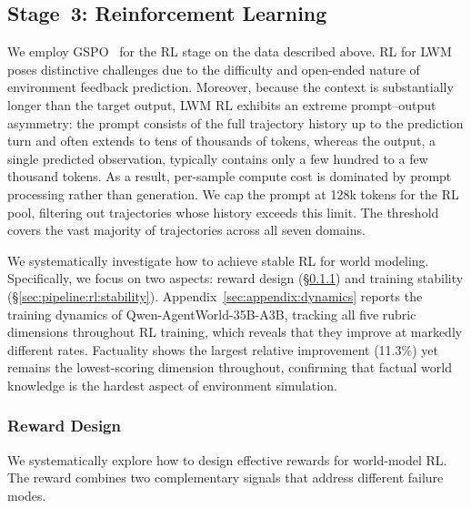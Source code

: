 \documentclass{llmxive}
\providecommand{\method}{Qwen-AgentWorld\xspace}
\begin{document}
\subsection{Stage~3: Reinforcement Learning}
\label{sec:pipeline:rl}

We employ GSPO~\citep{zheng2025group} for the RL stage on the data described above.
RL for LWM poses distinctive challenges due to the difficulty and open-ended nature of environment feedback prediction.
Moreover, because the context is substantially longer than the target output, LWM RL exhibits an extreme prompt--output asymmetry: the prompt consists of the full trajectory history up to the prediction turn and often extends to tens of thousands of tokens, whereas the output, a single predicted observation, typically contains only a few hundred to a few thousand tokens.
As a result, per-sample compute cost is dominated by prompt processing rather than generation.
We cap the prompt at 128k tokens for the RL pool, filtering out trajectories whose history exceeds this limit.
The threshold covers the vast majority of trajectories across all seven domains.

We systematically investigate how to achieve stable RL for world modeling. Specifically, we focus on two aspects: reward design (\S\ref{sec:pipeline:rl:reward}) and training stability (\S\ref{sec:pipeline:rl:stability}).
Appendix~\ref{sec:appendix:dynamics} reports the training dynamics of \method-35B-A3B, tracking all five rubric dimensions throughout RL training, which reveals that they improve at markedly different rates.
Factuality shows the largest relative improvement (11.3\%) yet remains the lowest-scoring dimension throughout, confirming that factual world knowledge is the hardest aspect of environment simulation.

\subsubsection{Reward Design}
\label{sec:pipeline:rl:reward}

We systematically explore how to design effective rewards for world-model RL. The reward combines two complementary signals that address different failure modes.
\end{document}
